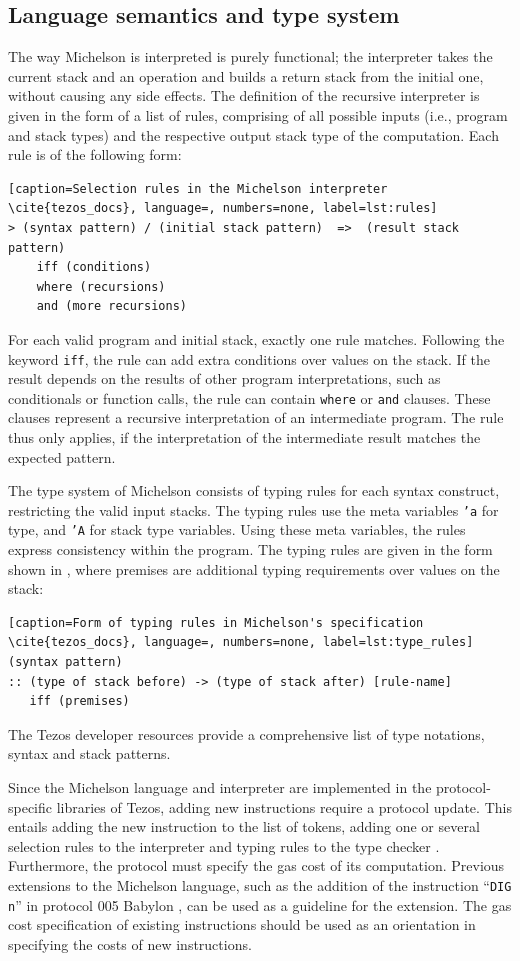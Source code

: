 \subsection{Language semantics and type system}\label{sec:michelson_semantics}
The way Michelson is interpreted is purely functional; the interpreter takes the current stack and an operation and builds a return stack from the initial one, without causing any side effects. The definition of the recursive interpreter is given in the form of a list of rules, comprising of all possible inputs (i.e., program and stack types) and the respective output stack type of the computation. Each rule is of the following form: 
\begin{lstlisting}[caption=Selection rules in the Michelson interpreter \cite{tezos_docs}, language=, numbers=none, label=lst:rules]
> (syntax pattern) / (initial stack pattern)  =>  (result stack pattern)
    iff (conditions)
    where (recursions)
    and (more recursions)
\end{lstlisting}
For each valid program and initial stack, exactly one rule matches. Following the keyword \texttt{iff}, the rule can add extra conditions over values on the stack. If the result depends on the results of other program interpretations, such as conditionals or function calls, the rule can contain \texttt{where} or \texttt{and} clauses. These clauses represent a recursive interpretation of an intermediate program. The rule thus only applies, if the interpretation of the intermediate result matches the expected pattern.

The type system of Michelson consists of typing rules for each syntax construct, restricting the valid input stacks. The typing rules use the meta variables \texttt{'a} for type, and \texttt{'A} for stack type variables. Using these meta variables, the rules express consistency within the program. The typing rules are given in the form shown in , where premises are additional typing requirements over values on the stack:
\begin{lstlisting}[caption=Form of typing rules in Michelson's specification \cite{tezos_docs}, language=, numbers=none, label=lst:type_rules]
(syntax pattern)
:: (type of stack before) -> (type of stack after) [rule-name]
   iff (premises)
\end{lstlisting}
The Tezos developer resources \cite{tezos_docs} provide a comprehensive list of type notations, syntax and stack patterns.

Since the Michelson language and interpreter are implemented in the protocol-specific libraries of Tezos, adding new instructions require a protocol update. This entails adding the new instruction to the list of tokens, adding one or several selection rules to the interpreter and typing rules to the type checker \cite{tezos_repo}. Furthermore, the protocol must specify the gas cost of its computation. Previous extensions to the Michelson language, such as the addition of the instruction ``\texttt{DIG n}'' in protocol 005 Babylon \cite{tezos_michelson_ext}, can be used as a guideline for the extension. The gas cost specification of existing instructions \cite{tezos_repo_gas} should be used as an orientation in specifying the costs of new instructions.

